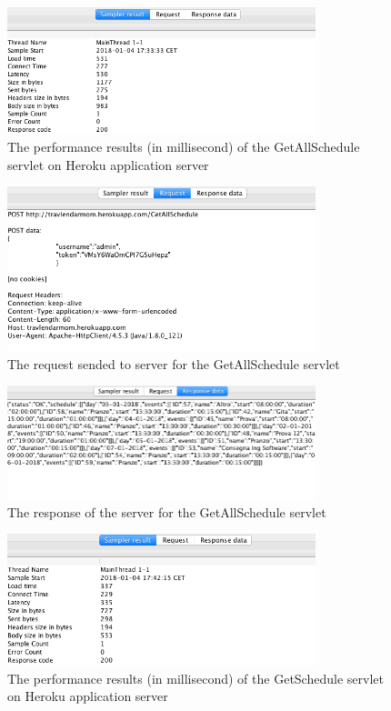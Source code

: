 \documentclass[numbers=noenddot, 12pt, a4paper, oneside]{scrbook}
\begin{document}
\begin{figure}[H]
	\centering
	\includegraphics[width=0.8\textwidth]{Test/GetAllScheduleMain}
	\caption{The performance results (in millisecond) of the GetAllSchedule servlet on Heroku application server}
\end{figure}

\begin{figure}[H]
	\centering
	\includegraphics[width=0.8\textwidth]{Test/GetAllScheduleReq}
	\caption{The request sended to server for the GetAllSchedule servlet}
\end{figure}

\begin{figure}[H]
	\centering
	\includegraphics[width=0.8\textwidth]{Test/GetAllScheduleResp}
	\caption{The response of the server for the GetAllSchedule servlet}
\end{figure}


\begin{figure}[H]
	\centering
	\includegraphics[width=0.8\textwidth]{Test/GetScheduleMain}
	\caption{The performance results (in millisecond) of the GetSchedule servlet on Heroku application server}
\end{figure}
\end{document}
